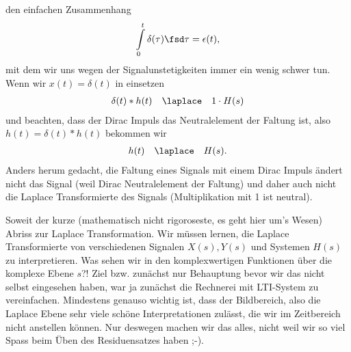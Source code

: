 den einfachen Zusammenhang
\begin{equation}
  \int\limits_{0}^{t} \delta(\tau)\fsd \tau = \epsilon(t),
\end{equation}
mit dem wir uns wegen der Signalunstetigkeiten immer ein wenig schwer tun.
%
Wenn wir $x(t)=\delta(t)$ in  einsetzen
\begin{align}
\delta(t) \ast h(t) \quad\laplace\quad 1 \cdot H(s)
\end{align}
und beachten, dass der Dirac Impuls das Neutralelement der Faltung ist,
also $h(t) = \delta(t) \ast h(t)$ bekommen wir
\begin{align}
h(t) \quad\laplace\quad H(s).
\end{align}
Anders herum gedacht, die Faltung eines Signals mit einem Dirac Impuls
ändert nicht das Signal (weil Dirac Neutralelement der Faltung) und
daher auch nicht die Laplace Transformierte des Signals (Multiplikation mit 1 ist
neutral).


Soweit der kurze (mathematisch nicht rigoroseste, es geht hier um's Wesen)
Abriss zur Laplace Transformation.
Wir müssen lernen, die Laplace Transformierte von verschiedenen
Signalen $X(s), Y(s)$ und Systemen $H(s)$ zu interpretieren. Was sehen wir in den
komplexwertigen Funktionen über die komplexe Ebene $s$?!
Ziel bzw. zunächst nur Behauptung bevor wir das nicht selbst eingesehen haben,
war ja zunächst die Rechnerei mit LTI-System zu vereinfachen.
Mindestens genauso wichtig ist, dass der Bildbereich, also die Laplace Ebene
sehr viele schöne Interpretationen zulässt, die wir im Zeitbereich nicht
anstellen können. Nur deswegen machen wir das alles, nicht weil wir so viel
Spass beim Üben des Residuensatzes haben ;-).














\newpage
